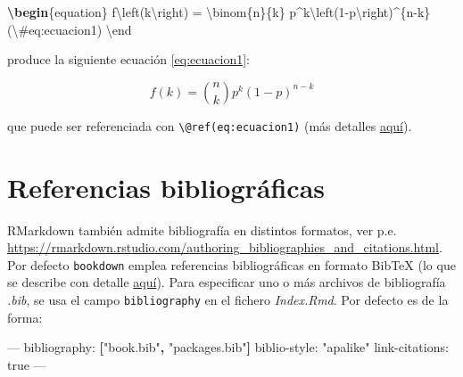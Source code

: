 \documentclass[]{book}
\newenvironment{Shaded}{\begin{snugshade}}{\end{snugshade}}
\newcommand{\KeywordTok}[1]{\textcolor[rgb]{0.13,0.29,0.53}{\textbf{#1}}}
\newcommand{\SpecialCharTok}[1]{\textcolor[rgb]{0.00,0.00,0.00}{#1}}
\newcommand{\StringTok}[1]{\textcolor[rgb]{0.31,0.60,0.02}{#1}}
\newcommand{\SpecialStringTok}[1]{\textcolor[rgb]{0.31,0.60,0.02}{#1}}
\newcommand{\OtherTok}[1]{\textcolor[rgb]{0.56,0.35,0.01}{#1}}
\newcommand{\FunctionTok}[1]{\textcolor[rgb]{0.00,0.00,0.00}{#1}}
\newcommand{\ExtensionTok}[1]{#1}
\newcommand{\AttributeTok}[1]{\textcolor[rgb]{0.77,0.63,0.00}{#1}}
\newcommand{\NormalTok}[1]{#1}
\theoremstyle{definition}
\theoremstyle{definition}
\theoremstyle{definition}
\theoremstyle{remark}
\begin{document}
\begin{Shaded}
\begin{Highlighting}[]
\KeywordTok{\textbackslash{}begin}\NormalTok{\{}\ExtensionTok{equation}\NormalTok{\}}\SpecialStringTok{ }
\SpecialStringTok{  f}\SpecialCharTok{\textbackslash{}left}\SpecialStringTok{(k}\SpecialCharTok{\textbackslash{}right}\SpecialStringTok{) = }\SpecialCharTok{\textbackslash{}binom}\SpecialStringTok{\{n\}\{k\} p^k}\SpecialCharTok{\textbackslash{}left}\SpecialStringTok{(1-p}\SpecialCharTok{\textbackslash{}right}\SpecialStringTok{)^\{n-k\}}
\SpecialStringTok{  (}\SpecialCharTok{\textbackslash{}#}\SpecialStringTok{eq:ecuacion1)}
\SpecialCharTok{\textbackslash{}end}
\end{Highlighting}
\end{Shaded}

produce la siguiente ecuación \eqref{eq:ecuacion1}:

\begin{equation}
f\left(k\right)=\binom{n}{k}p^k\left(1-p\right)^{n-k} \label{eq:ecuacion1}
\end{equation}

que puede ser referenciada con
\texttt{\textbackslash{}@ref(eq:ecuacion1)} (más detalles
\href{https://bookdown.org/yihui/bookdown/markdown-extensions-by-bookdown.html\#equations}{aquí}).

\section{Referencias bibliográficas}\label{referencias-bibliograficas}

RMarkdown también admite bibliografía en distintos formatos, ver p.e.
\url{https://rmarkdown.rstudio.com/authoring_bibliographies_and_citations.html}.
Por defecto \texttt{bookdown} emplea referencias bibliográficas en
formato BibTeX (lo que se describe con detalle
\href{https://bookdown.org/yihui/bookdown/citations.html}{aquí}). Para
especificar uno o más archivos de bibliografía \emph{.bib}, se usa el
campo \texttt{bibliography} en el fichero \emph{Index.Rmd}. Por defecto
es de la forma:

\begin{Shaded}
\begin{Highlighting}[]
\OtherTok{---}
\FunctionTok{bibliography:}\AttributeTok{ }\KeywordTok{[}\StringTok{"book.bib"}\KeywordTok{,} \StringTok{"packages.bib"}\KeywordTok{]}
\FunctionTok{biblio-style:}\AttributeTok{ }\StringTok{"apalike"}
\FunctionTok{link-citations:}\AttributeTok{ true}
\OtherTok{---}
\end{Highlighting}
\end{Shaded}
\end{document}
